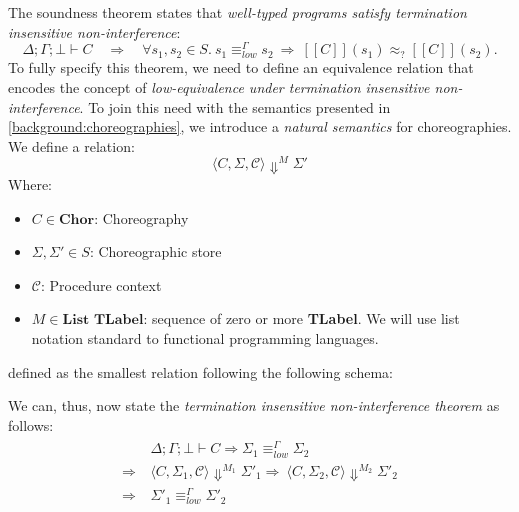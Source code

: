 \documentclass[12pt,a4paper,twoside]{book}
\newcommand{\llbracket}{[\![}
\newcommand{\rrbracket}{]\!]}
\begin{document}
The soundness theorem states that \emph{well-typed programs satisfy termination insensitive non-interference}:
\[
  \Delta;\Gamma;\bot \vdash C
  \quad\Longrightarrow\quad
  \forall s_1,s_2 \in S.\ s_1 \equiv^\Gamma_{low} s_2 \ \Rightarrow\ \llbracket C \rrbracket(s_1) \approx_? \llbracket C \rrbracket(s_2).
\]
To fully specify this theorem, we need to define an equivalence relation that encodes the concept of \emph{low-equivalence under termination insensitive non-interference}.
To join this need with the semantics presented in \ref{background:choreographies}, we introduce a \emph{natural semantics}\cite{kahn1987natural} for choreographies. We define a relation:
$$
\langle C, \Sigma, \mathscr{C} \rangle \Downarrow^M \Sigma'
$$
Where:
\begin{itemize}
	\item $C \in \textbf{Chor}$: Choreography
	\item $\Sigma, \Sigma' \in S$: Choreographic store
	\item $\mathscr{C}$: Procedure context
	\item $M \in \textbf{List TLabel}$: sequence of zero or more \textbf{TLabel}. We will use list notation standard to functional programming languages.
\end{itemize}
defined as the smallest relation following the following schema:

We can, thus, now state the \emph{termination insensitive non-interference theorem} as follows:
\begin{align} \label{main:def}
\begin{split}
	&\Delta;\Gamma;\bot \vdash C \Rightarrow
	\Sigma_1 \equiv^\Gamma_{low} \Sigma_2 \\ \Rightarrow\ &\langle C, \Sigma_1, \mathscr{C}\rangle \Downarrow^{M_1} \Sigma'_1
	\Rightarrow\ \langle C, \Sigma_2, \mathscr{C}\rangle \Downarrow^{M_2} \Sigma'_2 \\ \Rightarrow\ &\Sigma'_1 \equiv^\Gamma_{low} \Sigma'_2
\end{split}
\end{align}
\end{document}
